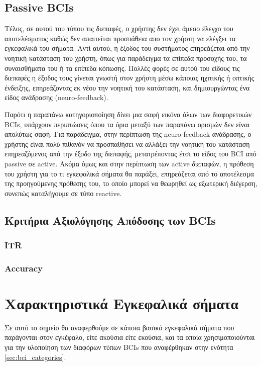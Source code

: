 \documentclass[11pt,a4paper,english,greek,twoside]{../Thesis}
\begin{document}
  \subsection{Passive BCIs}
  \par Τέλος, σε αυτού του τύπου τις διεπαφές, ο χρήστης δεν έχει άμεσο έλεγχο του αποτελέσματος καθώς δεν απαιτείται προσπάθεια απο τον χρήστη να ελέγξει τα εγκεφαλικά του σήματα. Αντί αυτού, η έξοδος του συστήματος επηρεάζεται από την νοητική κατάσταση του χρήστη, όπως για παράδειγμα τα επίπεδα προσοχής του, τα συναισθήματα του ή τα επίπεδα κόπωσης. Πολλές φορές σε αυτού του είδους τις διεπαφές η έξοδος τους γίνεται γνωστή στον χρήστη μέσω κάποιας ηχιτικής ή οπτικής ένδειξης, επηρεάζοντας εκ νέου την νοητική του κατάσταση, και δημιουργώντας ένα είδος ανάδρασης (neuro-feedback). 
  
  \par Παρότι η παραπάνω κατηγοριοποίηση δίνει μια σαφή εικόνα όλων των διαφορετικών BCIs, υπάρχουν περιπτώσεις όπου τα όρια μεταξύ των παραπάνω ορισμών δεν είναι απολύτως σαφή. Για παράδειγμα, στην περίπτωση της neuro-feedback ανάδρασης, ο χρήστης είναι πολύ πιθανόν να προσπαθήσει να αλλάξει την νοητική του κατάσταση επηρεαζόμενος από την έξοδο της διεπαφής, μετατρέποντας έτσι το είδος του BCI από passive σε active. Ακόμα όμως και στην περίπτωση των active διεπαφών, η πρόθεση του χρήστη για το τι εγκεφαλικά σήματα θα παράξει, επηρεάζεται από το αποτέλεσμα της προηγούμενης πρόθεσης του, το οποίο μπορεί να θεωρηθεί ως εξωτερική διέγερση, συνεπώς καταλήγουμε σε τύπο reactive. 

  \subsection{Κριτήρια Αξιολόγησης Απόδοσης των BCIs}
  \subsubsection{ITR}
  \subsubsection{Accuracy}
\section{Χαρακτηριστικά Εγκεφαλικά σήματα}
  \par Σε αυτό το σημείο θα αναφερθούμε σε κάποια βασικά εγκεφαλικά σήματα που παράγονται στον εγκέφαλο, είτε ακούσια είτε εκούσια, και τα οποία χρησιμοποιούνται για την υλοποίηση των διαφόρων τύπων BCIs που αναφέρθηκαν στην ενότητα \ref{sec:bci_categories}.
\end{document}

